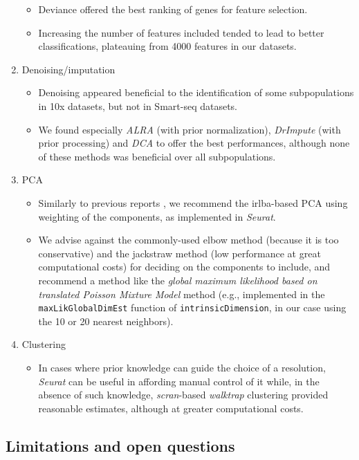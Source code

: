 \documentclass{bmcart}
\begin{document}
\begin{enumerate}
\begin{itemize}
     \item Deviance \cite{townesGlmpca2019} offered the best ranking of genes for feature selection.
     \item Increasing the number of features included tended to lead to better classifications, plateauing from 4000 features in our datasets.
   \end{itemize}
   \item Denoising/imputation
   \begin{itemize}
       \item Denoising appeared beneficial to the identification of some subpopulations in 10x datasets, but not in Smart-seq datasets.
       \item We found especially \textit{ALRA} (with prior normalization), \textit{DrImpute} (with prior processing) and \textit{DCA} to offer the best performances, although none of these methods was beneficial over all subpopulations.
   \end{itemize}
   \item PCA
   \begin{itemize}
     \item Similarly to previous reports \cite{SunDimRed2019}, we recommend the irlba-based PCA using weighting of the components, as implemented in \textit{Seurat}. 
     \item We advise against the commonly-used elbow method (because it is too conservative) and the jackstraw method (low performance at great computational costs) for deciding on the components to include, and recommend a method like the \textit{global maximum likelihood based on translated Poisson Mixture Model} method (e.g., implemented in the  \texttt{maxLikGlobalDimEst} function of \texttt{intrinsicDimension}, in our case using the 10 or 20 nearest neighbors).
   \end{itemize}
   \item Clustering
   \begin{itemize}
    \item In cases where prior knowledge can guide the choice of a resolution, \textit{Seurat} can be useful in affording manual control of it while, in the absence of such knowledge, \textit{scran}-based \textit{walktrap} clustering provided reasonable estimates{\color{red}, although at greater computational costs.} 
   \end{itemize}
\end{enumerate}

\subsection*{Limitations and open questions}
\end{document}
